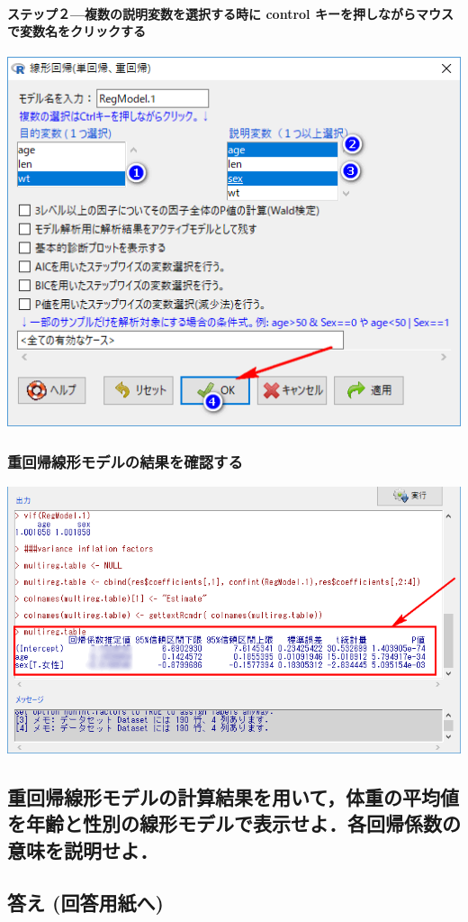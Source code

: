\documentclass[11pt,]{problemset}
\let\oldparagraph\paragraph
\renewcommand{\paragraph}[1]{\oldparagraph{#1}\mbox{}}
\begin{document}
\hypertarget{-control-}{%
\paragraph{ステップ２---複数の説明変数を選択する時に control
キーを押しながらマウスで変数名をクリックする}\label{-control-}}

\begin{center}\includegraphics[width=0.5\linewidth]{pic/lm04} \end{center}

\subsubsection{重回帰線形モデルの結果を確認する}

\begin{center}\includegraphics[width=0.7\linewidth,height=0.4\textheight]{pic/lm05cut} \end{center}

\subsection{重回帰線形モデルの計算結果を用いて，体重の平均値を年齢と性別の線形モデルで表示せよ．各回帰係数の意味を説明せよ．}

\hypertarget{--4}{%
\subsection{答え (回答用紙へ)}\label{--4}}
\end{document}
